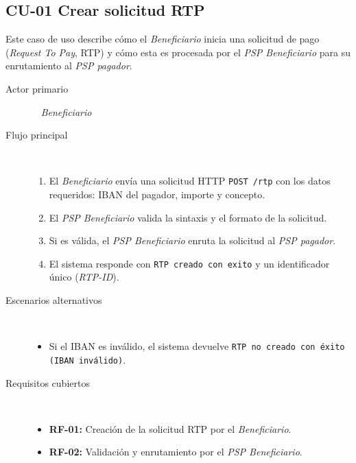 \subsection{CU-01 Crear solicitud RTP}
Este caso de uso describe cómo el \textit{Beneficiario} inicia una solicitud de pago (\textit{Request To Pay}, RTP) y cómo esta es procesada por el \textit{PSP Beneficiario} para su enrutamiento al \textit{PSP pagador}.
\begin{description}
  \item[Actor primario] ~ \textit{Beneficiario}
  \item[Flujo principal] ~
    \begin{enumerate}
      \item El \textit{Beneficiario} envía una solicitud HTTP \texttt{POST /rtp} con los datos requeridos: IBAN del pagador, importe y concepto.
      \item El \textit{PSP Beneficiario} valida la sintaxis y el formato de la solicitud.
      \item Si es válida, el \textit{PSP Beneficiario} enruta la solicitud al \textit{PSP pagador}.
      \item El sistema responde con \texttt{RTP creado con exito} y un identificador único (\textit{RTP-ID}).
    \end{enumerate}
  \item[Escenarios alternativos] ~
    \begin{itemize}
      \item Si el IBAN es inválido, el sistema devuelve \texttt{RTP no creado con éxito (IBAN inválido)}.
    \end{itemize}
  \item[Requisitos cubiertos] ~
    \begin{itemize}
      \item \textbf{RF-01:} Creación de la solicitud RTP por el \textit{Beneficiario}.
      \item \textbf{RF-02:} Validación y enrutamiento por el \textit{PSP Beneficiario}.
    \end{itemize}
\end{description}

